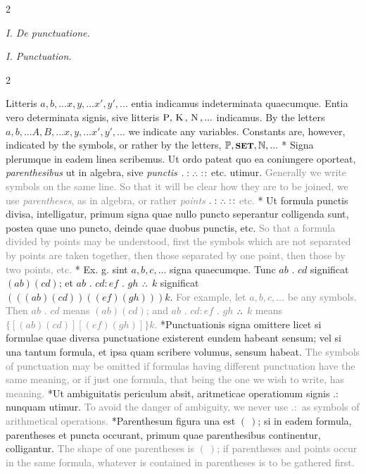 \documentclass{book}
\newcommand{\pppNoSpace}{\leavevmode\lower0ex\hbox{.}\kern-0.1em\raise0.7ex\hbox{.}\kern-0.1em\lower0ex\hbox{.}} %
\newcommand{\K}{\mathop{\thinspace \text{K} \thinspace}}
\newcommand{\N}{\mathop{\thinspace \text{N} \thinspace}}
\newcommand{\setOfSets}{\mathop{\text{{\footnotesize \textbf{SET}}}}}
\newcommand\irrelevant[1]{\textcolor{gray}{#1}}
\newcommand\peanoHeadingSmall[1]{ \vspace{0.75cm} \textit{#1} \nopagebreak[4]

\vspace{0.25cm} \nopagebreak[1]}
\newenvironment{translateTwoCol}
               { %
                 \columnratio{0.5, 0.5}
                 \begin{paracol}{2}
                 \newcommand{\LAT}{\switchcolumn[0]*}
                 \newcommand{\ENG}{\switchcolumn[1]}
               }
               { %
                 \let\ENG\undefined
                 \let\LAT\undefined
                 \end{paracol}
               }
\begin{document}
\begin{translateTwoCol}
\centering
{}
{}
\peanoHeadingSmall{I. De punctuatione.}
\ENG
\peanoHeadingSmall{I. Punctuation.}
\end{translateTwoCol}

\begin{translateTwoCol}
Litteris $a,b,... x,y,... x', y',...$ entia indicamus indeterminata quaecumque. Entia vero determinata signis, sive litteris $\text{P}, \K, \N,...$ indicamus.
\ENG
By the letters $a,b,... A,B,... x,y,... x', y',...$ we indicate any variables. Constants are, however, indicated by the symbols, or rather by the letters, $\mathbb{P}, \setOfSets, \mathbb{N},...$ 
\LAT
Signa plerumque in eadem linea scribemus. Ut ordo pateat quo ea coniungere oporteat, \emph{parenthesibus} ut in algebra, sive \emph{punctis} $. : \pppNoSpace :\hspace{0.1em}:$ etc. utimur.
\ENG
\irrelevant{Generally we write symbols on the same line. So that it will be clear how they are to be joined, we use \emph{parentheses}, as in algebra, or rather \emph{points} $. : \pppNoSpace :\hspace{0.1em}:$ etc.}
\LAT
Ut formula punctis divisa, intelligatur, primum signa quae nullo puncto seperantur colligenda sunt, postea quae uno puncto, deinde quae duobus punctis, etc.
\ENG
\irrelevant{So that a formula divided by points may be understood, first the symbols which are not separated by points are taken together, then those separated by one point, then those by two points, etc.}
\LAT
Ex. g. sint $a,b,c,...$ signa quaecumque. Tunc $ab$ $.$ $cd$ significat $(ab)(cd)$; et $ab$ $.$ $cd:ef$ $.$ $gh$ $\pppNoSpace$ $k$ significat $(((ab)(cd))((ef)(gh)))k$.
\ENG
\irrelevant{For example, let $a,b,c,...$ be any symbols. Then $ab$ $.$ $cd$ means $(ab)(cd)$; and $ab$ $.$ $cd:ef$ $.$ $gh$ $\pppNoSpace$ $k$ means $\{[(ab)(cd)][(ef)(gh)]\}k$.}
\LAT Punctuationis signa omittere licet si formulae quae diversa punctuatione existerent eundem habeant sensum; vel si una tantum formula, et ipsa quam scribere volumus, sensum habeat.
\ENG \irrelevant{The symbols of punctuation may be omitted if formulas having different punctuation have the same meaning, or if just one formula, that being the one we wish to write, has meaning.}
\LAT Ut ambiguitatis periculum absit, aritmeticae operationum signis $. :$ nunquam utimur.
\ENG \irrelevant{To avoid the danger of ambiguity, we never use $. :$ as symbols of arithmetical operations.}
\LAT Parenthesum figura una est $( \ )$; si in eadem formula, parentheses et puncta occurant, primum quae parenthesibus continentur, colligantur.
\ENG \irrelevant{The shape of one parentheses is $( \ )$; if parentheses and points occur in the same formula, whatever is contained in parentheses is to be gathered first.}  %
\end{translateTwoCol}
\end{document}
